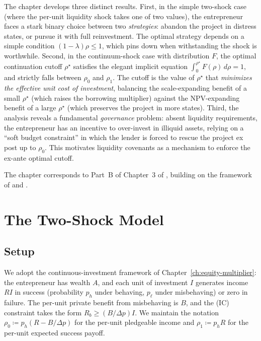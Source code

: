 \documentclass[11pt,a4paper,oneside]{book}
\def\leq{\leqslant}
\def\geq{\geqslant}
\theoremstyle{plain}
\theoremstyle{definition}
\theoremstyle{remark}
\numberwithin{equation}{chapter}
\begin{document}
The chapter develops three distinct results.
First, in the simple two-shock case (where the per-unit liquidity shock takes one of two values), the entrepreneur faces a stark binary choice between two \emph{strategies}: abandon the project in distress states, or pursue it with full reinvestment.
The optimal strategy depends on a simple condition $(1-\lambda)\rho \leq 1$, which pins down when withstanding the shock is worthwhile.
Second, in the continuum-shock case with distribution $F$, the optimal continuation cutoff $\rho^\star$ satisfies the elegant implicit equation $\int_0^{\rho^\star} F(\rho) \, d\rho = 1$, and strictly falls between $\rho_0$ and $\rho_1$.
The cutoff is the value of $\rho^\star$ that \emph{minimizes the effective unit cost of investment}, balancing the scale-expanding benefit of a small $\rho^\star$ (which raises the borrowing multiplier) against the NPV-expanding benefit of a large $\rho^\star$ (which preserves the project in more states).
Third, the analysis reveals a fundamental \emph{governance} problem: absent liquidity requirements, the entrepreneur has an incentive to over-invest in illiquid assets, relying on a ``soft budget constraint'' in which the lender is forced to rescue the project ex post up to $\rho_0$.
This motivates liquidity covenants as a mechanism to enforce the ex-ante optimal cutoff.

The chapter corresponds to Part~B of Chapter~3 of \citet{Tirole2006}, building on the framework of \citet{HolmstromTirole1998} and \citet{HolmstromTirole2000}.

\section{The Two-Shock Model}
\label{sec:LS-two-shock}

\subsection{Setup}

We adopt the continuous-investment framework of Chapter~\ref{ch:equity-multiplier}: the entrepreneur has wealth $A$, and each unit of investment $I$ generates income $RI$ in success (probability $p_h$ under behaving, $p_\ell$ under misbehaving) or zero in failure.
The per-unit private benefit from misbehaving is $B$, and the (IC) constraint takes the form $R_b \geq (B/\Delta p) I$.
We maintain the notation $\rho_0 \coloneqq p_h(R - B/\Delta p)$ for the per-unit pledgeable income and $\rho_1 \coloneqq p_h R$ for the per-unit expected success payoff.
\end{document}
